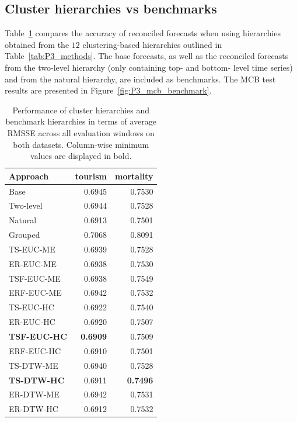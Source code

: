 \documentclass[a4paper,review,12pt,authoryear]{elsarticle}
\begin{document}
\subsection{Cluster hierarchies vs benchmarks}
\label{subsec:cluster_vs_benchmarks}


 
Table~\ref{tab:P3_rmsse} compares the accuracy of reconciled forecasts when using hierarchies obtained from the $12$ clustering-based hierarchies outlined in Table~\ref{tab:P3_methods}. The base forecasts, as well as the reconciled forecasts from the two-level hierarchy (only containing top- and bottom- level time series) and from the natural hierarchy, are included as benchmarks.
The MCB test results are presented in Figure~\ref{fig:P3_mcb_benchmark}.

\begin{table}[h!]
    \centering
\caption{\label{tab:P3_rmsse}Performance of cluster hierarchies and benchmark hierarchies in terms of average RMSSE across all evaluation windows on both datasets. Column-wise minimum values are displayed in bold.}
\begin{tabular}{lrr}\toprule
    Approach & tourism & mortality \\ \midrule
    Base & 0.6945 & 0.7530 \\ 
    Two-level & 0.6944 & 0.7528 \\ 
    Natural & 0.6913 & 0.7501 \\ 
    Grouped & 0.7068 & 0.8091\\
    TS-EUC-ME & 0.6939 & 0.7528 \\ 
    ER-EUC-ME & 0.6938 & 0.7530 \\ 
    TSF-EUC-ME & 0.6938 & 0.7549 \\ 
    ERF-EUC-ME & 0.6942 & 0.7532 \\ 
    TS-EUC-HC & 0.6922 & 0.7540 \\ 
    ER-EUC-HC & 0.6920 & 0.7507 \\ 
    \textbf{TSF-EUC-HC} & \textbf{0.6909} & 0.7509 \\ 
    ERF-EUC-HC & 0.6910 & 0.7501 \\ 
    TS-DTW-ME & 0.6940 & 0.7528 \\ 
    \textbf{TS-DTW-HC} & 0.6911 & \textbf{0.7496} \\ 
    ER-DTW-ME & 0.6942 & 0.7531 \\ 
    ER-DTW-HC & 0.6912 & 0.7532 \\ \bottomrule
\end{tabular}

\end{table}
\end{document}
